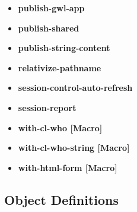 \documentclass [11pt]{book}
\begin{document}
\begin{itemize}
\item {}
\label{prim:publish-gwl-app}
\textbf{publish-gwl-app}





\item {}
\label{prim:publish-shared}
\textbf{publish-shared}





\item {}
\label{prim:publish-string-content}
\textbf{publish-string-content}





\item {}
\label{prim:relativize-pathname}
\textbf{relativize-pathname}





\item {}
\label{prim:session-control-auto-refresh}
\textbf{session-control-auto-refresh}





\item {}
\label{prim:session-report}
\textbf{session-report}





\item {}
\label{prim:with-cl-who}
\textbf{with-cl-who [Macro]}





\item {}
\label{prim:with-cl-who-string}
\textbf{with-cl-who-string [Macro]}





\item {}
\label{prim:with-html-form}
\textbf{with-html-form [Macro]}





\end{itemize}



\subsection{Object Definitions}
\end{document}
